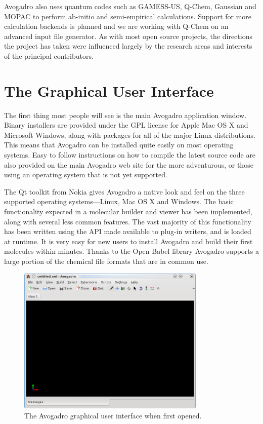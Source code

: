 \documentclass{article}
\begin{document}
Avogadro also uses quantum codes such as GAMESS-US, Q-Chem, Gaussian and MOPAC to perform ab-initio and semi-empirical calculations. Support for more calculation backends is planned and we are working with Q-Chem on an advanced input file generator. As with most open source projects, the directions the project has taken were influenced largely by the research areas and interests of the principal contributors.

\section{The Graphical User Interface}

The first thing most people will see is the main Avogadro application window. Binary installers are provided under the GPL license for Apple Mac OS X and Microsoft Windows, along with packages for all of the major Linux distributions. This means that Avogadro can be installed quite easily on most operating systems. Easy to follow instructions on how to compile the latest source code are also provided on the main Avogadro web site for the more adventurous, or those using an operating system that is not yet supported.

The Qt toolkit from Nokia gives Avogadro a native look and feel on the three supported operating systems---Linux, Mac OS X and Windows. The basic functionality expected in a molecular builder and viewer has been implemented, along with several less common features. The vast majority of this functionality has been written using the API made available to plug-in writers, and is loaded at runtime. It is very easy for new users to install Avogadro and build their first molecules within minutes. Thanks to the Open Babel library Avogadro supports a large portion of the chemical file formats that are in common use.

\begin{figure}
	\begin{center}
    \includegraphics[width=0.8\textwidth]{images/avogadro-0-9-8}
  \end{center}
	\caption{The Avogadro graphical user interface when first opened.}
	\label{f:avogadrogui}
\end{figure}
\end{document}
